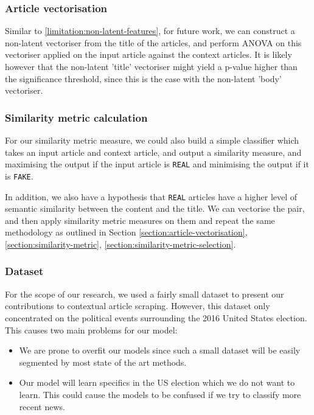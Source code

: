 \documentclass{article}
\begin{document}
\subsubsection*{Article vectorisation}\label{limitation:article-vectorisation}
Similar to \ref{limitation:non-latent-features}, for future work, we can construct a non-latent vectoriser from the title of the articles, and perform ANOVA on this vectoriser applied on the input article against the context articles. It is likely however that the non-latent 'title' vectoriser might yield a p-value higher than the significance threshold, since this is the case with the non-latent 'body' vectoriser.

\subsubsection*{Similarity metric calculation}\label{limitation:similarity-metric}
For our similarity metric measure, we could also build a simple classifier which takes an input article and context article, and output a similarity measure, and maximising the output if the input article is \texttt{REAL} and minimising the output if it is \texttt{FAKE}.

In addition, we also have a hypothesis that \texttt{REAL} articles have a higher level of semantic similarity between the content and the title. We can vectorise the pair, and then apply similarity metric measures on them and repeat the same methodology as outlined in Section \ref{section:article-vectorisation}, \ref{section:similarity-metric}, \ref{section:similarity-metric-selection}.

\subsubsection*{Dataset}

For the scope of our research, we used a fairly small dataset to present our contributions to contextual article scraping. However, this dataset only concentrated on the political events surrounding the 2016 United States election. This causes two main problems for our model:
\begin{itemize}
  \item We are prone to overfit our models since such a small dataset will be easily segmented by most state of the art methods.
  \item Our model will learn specifics in the US election which we do not want to learn. This could cause the models to be confused if we try to classify more recent news.
\end{itemize}
\end{document}
